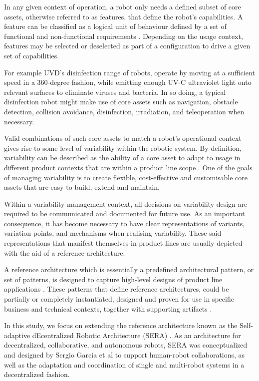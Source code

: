 \documentclass[conference]{IEEEtran}
\begin{document}
In any given context of operation, a robot only needs a defined subset of core assets, otherwise referred to as features, that define the robot's capabilities. A feature can be classified as a logical unit of behaviour defined by a set of functional and non-functional requirements \cite{feats}. Depending on the usage context, features may be selected or deselected as part of a configuration to drive a given set of capabilities. 

For example UVD's disinfection range of robots, operate by moving at a sufficient speed in a 360-degree fashion, while emitting enough UV-C ultraviolet light onto relevant surfaces to eliminate viruses and bacteria. In so doing, a typical disinfection robot might make use of core assets such as navigation, obstacle detection, collision avoidance, disinfection, irradiation, and teleoperation when necessary.

Valid combinations of such core assets to match a robot's operational context gives rise to some level of variability within the robotic system. By definition, variability can be described as the ability of a core asset to adapt to usage in different product contexts that are within a product line scope \cite{variab}. One of the goals of managing variability is to create flexible, cost-effective and customisable core assets that are easy to build, extend and maintain.

Within a variability management context, all decisions on variability design are required to be communicated and documented for future use. As an important consequence, it has become necessary to have clear representations of variants, variation points, and mechanisms when realising variability. These said representations that manifest themselves in product lines are usually depicted with the aid of a reference architecture.

A reference architecture which is essentially a predefined architectural pattern, or set of patterns, is designed to capture high-level designs of product line applications \cite{sple}. These patterns that define reference architectures, could be partially or completely instantiated, designed and proven for use in specific business and technical contexts, together with supporting artifacts \cite{ref-arch}.

In this study, we focus on extending the reference architecture known as the Self-adaptive dEcentralized Robotic Architecture (SERA) \cite{sera}. As an architecture for decentralized, collaborative, and autonomous robots, SERA was conceptualized and designed by Sergio Garc\'{i}a et al to support human-robot collaborations, as well as the adaptation and coordination of single and multi-robot systems in a decentralized fashion.
\end{document}
